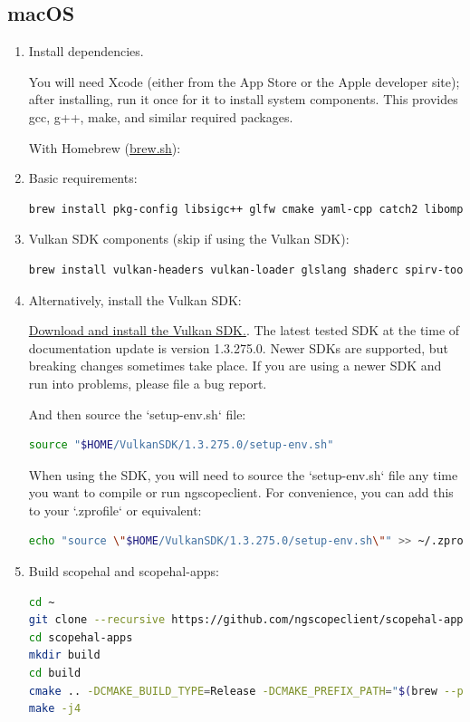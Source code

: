 \subsection{macOS}
\begin{enumerate}

\item Install dependencies.

You will need Xcode (either from the App Store or the Apple developer site); after installing, run it once for it
to install system components. This provides gcc, g++, make, and similar required packages.

With Homebrew (\href{https://brew.sh}{brew.sh}):

\item Basic requirements:
\begin{lstlisting}[language=sh, numbers=none]
brew install pkg-config libsigc++ glfw cmake yaml-cpp catch2 libomp hidapi libpng
\end{lstlisting}

\item Vulkan SDK components (skip if using the Vulkan SDK):
\begin{lstlisting}[language=sh, numbers=none]
brew install vulkan-headers vulkan-loader glslang shaderc spirv-tools molten-vk
\end{lstlisting}

\item Alternatively, install the Vulkan SDK:

 \href{https://vulkan.lunarg.com/sdk/home}{Download and install the Vulkan SDK.}.
The latest tested SDK at the time of documentation update is version 1.3.275.0. Newer SDKs are supported, but breaking
changes sometimes take place.
If you are using a newer SDK and run into problems, please file a bug report.

And then source the `setup-env.sh` file:
\begin{lstlisting}[language=sh, numbers=none]
source "$HOME/VulkanSDK/1.3.275.0/setup-env.sh"
\end{lstlisting}

When using the SDK, you will need to source the `setup-env.sh` file any time you want to compile or run ngscopeclient.
For convenience, you can add this to your `.zprofile` or equivalent:
\begin{lstlisting}[language=sh, numbers=none]
echo "source \"$HOME/VulkanSDK/1.3.275.0/setup-env.sh\"" >> ~/.zprofile
\end{lstlisting}

\item Build scopehal and scopehal-apps:

\begin{lstlisting}[language=sh, numbers=none]
cd ~
git clone --recursive https://github.com/ngscopeclient/scopehal-apps.git
cd scopehal-apps
mkdir build
cd build
cmake .. -DCMAKE_BUILD_TYPE=Release -DCMAKE_PREFIX_PATH="$(brew --prefix);$(brew --prefix)/opt/libomp"
make -j4
\end{lstlisting}

\end{enumerate}

